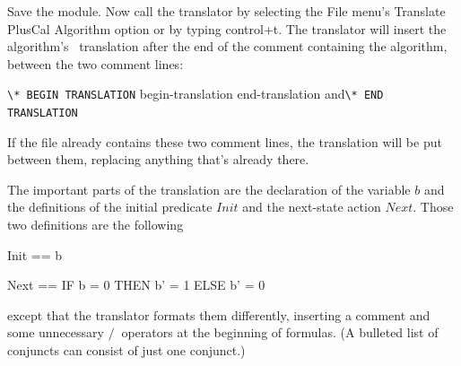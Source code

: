 \documentclass[fleqn,leqno]{article}
\begin{document}
%
Save the module.  Now 
call the translator by selecting the \textsf{File} menu's
\textsf{Translate PlusCal Algorithm} option or by typing
\textsf{control+t}.  The translator will insert the algorithm's
\tlaplus\ translation after the end of the comment containing the
algorithm, between the two comment lines:
\begin{display}
\verb|\* BEGIN TRANSLATION|  
  {begin-translation}%
  {end-translation}%
and\verb|\* END TRANSLATION|
\end{display}
If the file already contains these two comment lines, the translation
will be put between them, replacing anything that's already there.

The important parts of the translation are the declaration
of the variable $b$ and the definitions of the initial predicate
$Init$ and the next-state action $Next$.  Those two definitions are
the following
\begin{display}
\begin{notla}
Init == b 

Next == IF b = 0 THEN  b' = 1
                 ELSE  b' = 0
\end{notla}
\begin{tlatex}
%
\par\vspace{8.0pt}%
%
%
\end{tlatex}
\end{display}
except that the translator formats them differently, inserting a
comment and some unnecessary $/\ $ operators at the beginning of
formulas.  (A bulleted list of conjuncts can consist of just one
conjunct.)
\end{document}
